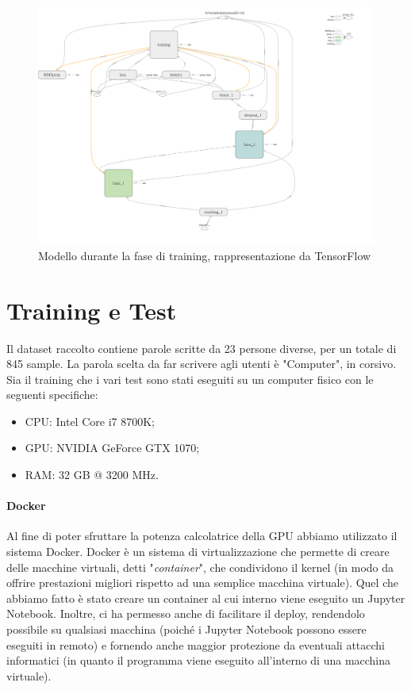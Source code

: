 \documentclass[8pt,notitlepage]{report}
\begin{document}
			\begin{figure}
				\begin{center}
					\includegraphics[scale=.23]{lstm_model}
					\caption{Modello durante la fase di training, rappresentazione da TensorFlow}
				\end{center}
			\end{figure}		
		


\chapter{Training e Test}
	Il dataset raccolto contiene parole scritte da 23 persone diverse, per un totale di 845 sample. La parola scelta da far scrivere agli utenti è "Computer", in corsivo. \\
	Sia il training che i vari test sono stati eseguiti su un computer fisico con le seguenti specifiche:
	\begin{itemize}
		\item CPU: Intel Core i7 8700K;
		\item GPU: NVIDIA GeForce GTX 1070;
		\item RAM: 32 GB @ 3200 MHz.
	\end{itemize}
	
	\subsubsection*{Docker}
	Al fine di poter sfruttare la potenza calcolatrice della GPU abbiamo utilizzato il sistema Docker. Docker è un sistema di virtualizzazione che permette di creare delle macchine virtuali, detti "\textit{container}", che condividono il kernel (in modo da offrire prestazioni migliori rispetto ad una semplice macchina virtuale). Quel che abbiamo fatto è stato creare un container al cui interno viene eseguito un Jupyter Notebook. Inoltre, ci ha permesso anche di facilitare il deploy, rendendolo possibile su qualsiasi macchina (poiché i Jupyter Notebook possono essere eseguiti in remoto) e fornendo anche maggior protezione da eventuali attacchi informatici (in quanto il programma viene eseguito all'interno di una macchina virtuale). 
	
\end{document}
